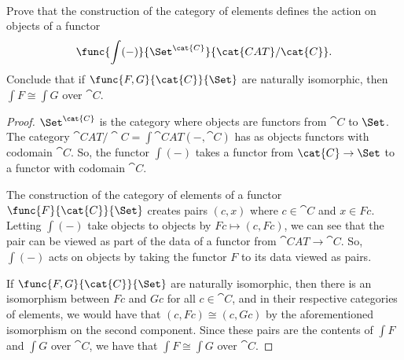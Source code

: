 \documentclass[main.tex]{subfiles}
\begin{document}
\paragraph{}
\begin{exercise}
	Prove that the construction of the category of elements defines the action on objects of a functor
	$$
	\func{\int(-)}{\Set^{\cat{C}}}{\cat{CAT}/\cat{C}}.
	$$
	Conclude that if $\func{F,G}{\cat{C}}{\Set}$ are naturally isomorphic, then $\int F \cong \int G$ over $\cat{C}$.
\end{exercise}
\begin{proof}
	$\Set^\cat{C}$ is the category where objects are functors from
	$\cat{C}$ to $\Set$. The category $\cat{CAT}/\cat{C} =
	\int\cat{CAT}(-,\cat{C})$ has as objects functors with codomain
	$\cat{C}$. So, the functor $\int(-)$ takes a functor from
	$\cat{C}\rightarrow\Set$ to a functor with codomain $\cat{C}$.
	
	The construction of the category of elements of a functor
	$\func{F}{\cat{C}}{\Set}$ creates pairs $(c,x)$ where $c\in\cat{C}$ and
	$x\in Fc$. Letting $\int(-)$ take objects to objects by
	$Fc\mapsto(c,Fc)$, we can see that the pair can be viewed as part of
	the data of a functor from $\cat{CAT}\rightarrow\cat{C}$. So, $\int(-)$
	acts on objects by taking the functor $F$ to its data viewed as pairs.
	
	If $\func{F,G}{\cat{C}}{\Set}$ are naturally isomorphic, then there is
	an isomorphism between $Fc$ and $Gc$ for all $c\in\cat{C}$, and in
	their respective categories of elements, we would have that
	$(c,Fc)\cong(c,Gc)$ by the aforementioned isomorphism on the second
	component. Since these pairs are  the contents of $\int F$ and $\int G$
	over $\cat{C}$, we have that $\int F\cong \int G$ over $\cat{C}$.
	
\end{proof}
\end{document}
